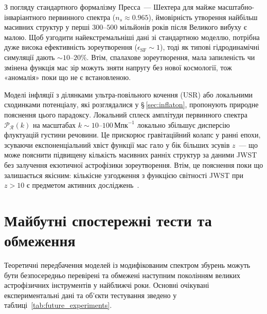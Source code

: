 З погляду стандартного формалізму Пресса~--- Шехтера для майже масштабно-інваріантного первинного спектра ($n_s \approx 0.965$), ймовірність утворення найбільш масивних структур у перші $300\text{--}500$ мільйонів років після Великого вибуху є малою. Щоб узгодити найекстремальніші дані зі стандартною моделлю, потрібна дуже висока ефективність зореутворення ($\epsilon_\mathrm{SF} \sim 1$), тоді як типові гідродинамічні симуляції дають $\sim10$--$20\%$. Втім, спалахове зореутворення, мала запиленість чи змінена функція мас зір можуть зняти напругу без нової космології, тож «аномалія» поки що не є встановленою.

Моделі інфляції з ділянками ультра-повільного кочення (USR) або локальними сходинками потенціалу, які розглядалися у §\,\ref{sec:inflaton}, пропонують природне пояснення цього парадоксу. Локальний сплеск амплітуди первинного спектра $\mathcal{P}_{\mathcal{R}}(k)$ на масштабах $k \sim 10\text{--}100\,\text{Мпк}^{-1}$ локально збільшує дисперсію флуктуацій густини речовини. Це прискорює гравітаційний колапс у ранні епохи, зсуваючи експоненціальний хвіст функції мас гало у бік більших зсувів $z$~--- що може пояснити підвищену кількість масивних ранніх структур за даними JWST без залучення екзотичної астрофізики зореутворення. Втім, це пояснення поки що залишається якісним: кількісне узгодження з функцією світності JWST при $z > 10$ є предметом активних досліджень~\cite{boylan_kolchin_2023}.

\section{Майбутні спостережні тести та обмеження}
\label{sec:observations}

Теоретичні передбачення моделей із модифікованим спектром збурень можуть бути безпосередньо перевірені та обмежені наступним поколінням великих астрофізичних інструментів у найближчі роки. Основні очікувані експериментальні дані та об'єкти тестування зведено у таблиці~\ref{tab:future_experiments}.

